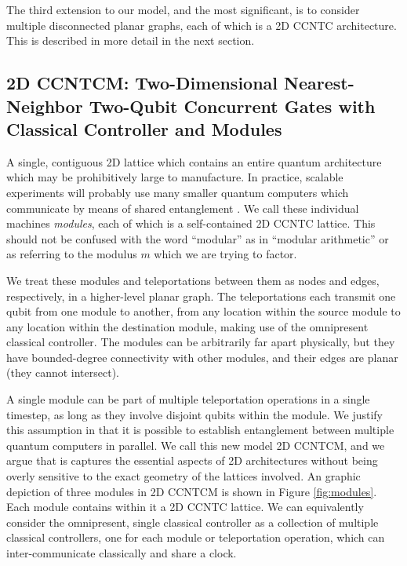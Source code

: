 \documentclass[twoside]{article}
\begin{document}
The third extension to our model, and the most significant, is to consider
multiple disconnected planar graphs, each of which is a 2D CCNTC
architecture. This is described in more detail in the next section.

\subsection{\textsc{2D CCNTCM}: Two-Dimensional Nearest-Neighbor Two-Qubit Concurrent Gates with Classical Controller and Modules}
\label{subsec:2dccntcm}

A single, contiguous
2D lattice which contains an entire quantum architecture which may be prohibitively large to manufacture. In practice,
scalable experiments will probably use many
smaller quantum computers which communicate by means of shared
entanglement \cite{Monroe2012}.
We call these individual machines \emph{modules}, each of
which is a self-contained \textsc{2D CCNTC} lattice. This should not be
confused with the word ``modular'' as in ``modular arithmetic'' or as
referring to the modulus $m$ which we are trying to factor.

We treat these modules
and teleportations between them as nodes and edges, respectively,
in a higher-level planar graph. The teleportations each transmit one qubit
from one module to another, from any location within the source module
to any location within the destination module, making use of the
omnipresent classical controller. The modules can be arbitrarily far
apart physically, but they have bounded-degree connectivity with other
modules, and their edges are planar (they cannot intersect).

A single module can be part of multiple teleportation operations in a single timestep, as long as they involve disjoint qubits within the module.
We justify this assumption in that it is
possible to establish entanglement between multiple
quantum computers
in parallel. We call this new model \textsc{2D CCNTCM},
and we argue that is captures the essential aspects of 2D architectures
without being overly sensitive to the exact geometry of the lattices involved.
An graphic depiction of three modules in \textsc{2D CCNTCM} is shown in
Figure \ref{fig:modules}. Each module contains within it a
\textsc{2D CCNTC} lattice. We can equivalently consider the omnipresent,
single
classical controller as a collection of multiple classical controllers, one
for each module or teleportation operation, which can inter-communicate
classically and share a clock.
\end{document}
